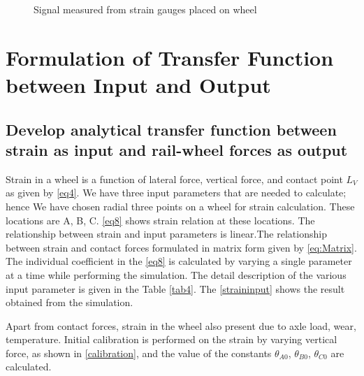 \documentclass[]{interact}
\theoremstyle{plain}%
\theoremstyle{definition}
\theoremstyle{remark}
\begin{document}
\begin{figure}[h]

\caption{Signal measured from strain gauges  placed on wheel} \label{fig:strainWBsignal}
\end{figure}

\section{Formulation of Transfer Function between Input and Output}
\subsection{Develop analytical transfer function between strain as input and rail-wheel forces as output}
Strain in a wheel is a function of lateral force, vertical force, and contact point $L_V$ as given by \cref{eq4}. We have three input parameters that are needed to calculate; hence We have chosen radial three points on a wheel for strain calculation. These locations are A, B, C. \cref{eq8} shows strain relation at these locations. The relationship between strain and input parameters is linear.The relationship between strain and contact forces formulated in matrix form given by \cref{eq:Matrix}. The individual coefficient in the \cref{eq8} is calculated by varying a single parameter at a time while performing the simulation. The detail description of the various input parameter is given in the Table \ref{tab4}. The \cref{straininput}  shows the result obtained from the simulation.

Apart from contact forces, strain in the wheel also present due to axle load, wear, temperature. Initial calibration is performed on the strain by varying vertical force, as shown in \cref{calibration}, and the value of the constants $\theta_{A0}$, $\theta_{B0}$, $\theta_{C0}$ are calculated. 
\end{document}
